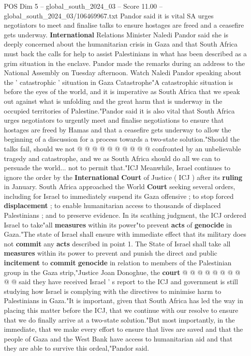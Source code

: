 \begin{textsample}{POS Dim 5 – global\_south\_2024\_03 – Score 11.00 – global\_south\_2024\_03/106469967.txt}  \label{ex:f5_pos_249}
Pandor said it is vital SA urges negotiators to meet and finalise talks to ensure hostages are freed and a ceasefire gets underway. \textbf{International} Relations Minister Naledi Pandor said she is deeply concerned about the humanitarian crisis in Gaza and that South Africa must back the calls for help to assist Palestinians in what has been described as a grim situation in the enclave.
Pandor made the remarks during an address to the National Assembly on Tuesday afternoon.
Watch Naledi Pandor speaking about the ' catastrophic ' situation in Gaza Catastrophe"A catastrophic situation is before the eyes of the world, and it is imperative as South Africa that we speak out against what is unfolding and the great harm that is underway in the occupied territories of Palestine."Pandor said it is also vital that South Africa urges negotiators to urgently meet and finalise negotiations to ensure that hostages are freed by Hamas and that a ceasefire gets underway to allow the beginning of a discussion for a process towards a two-state solution."Should the talks fail, should we not @ @ @ @ @ @ @ @ @ @ confronted by an unbelievable tragedy and catastrophe, and we as South Africa should do all we can to persuade the world... not to permit that."ICJ Meanwhile, Israel continues to ignore the order by the \textbf{International} \textbf{Court} of Justice ( ICJ ) after its \textbf{ruling} in January.
South Africa approached the World \textbf{Court} seeking several orders, including for Israel to immediately suspend its Gaza offensive ; to stop forced \textbf{displacement} ; to enable humanitarian access to thousands of displaced Palestinians ; and to preserve evidence.
In its scathing judgment, the ICJ ordered Israel to take"all \textbf{measures} within its power"to prevent \textbf{acts} of \textbf{genocide} in Gaza."The state of Israel shall ensure with immediate effect that its military does not \textbf{commit} any \textbf{acts} described in point 1.
The State of Israel shall take all \textbf{measures} within its power to prevent and punish the direct and public \textbf{incitement} to \textbf{commit} \textbf{genocide} in relation to members of the Palestinian group in the Gaza strip,"Justice Joan Donoghue, the \textbf{court} @ @ @ @ @ @ @ @ @ @ said they have received Israel ' s report to the ICJ and government is still studying how Israel is complying with the directives to minimise harm to Palestinians in Gaza."It is important, given that South Africa has led the way in placing this matter before the ICJ, that we continue with our resolve to ensure that we do finally arrive at a two-state solution."But most importantly, in the immediate, that we make every effort to ensure that lives are saved and that the people of Gaza and the West Bank have access to humanitarian aid and that they are able to survive this ordeal,"Pandor said.

\end{textsample}
